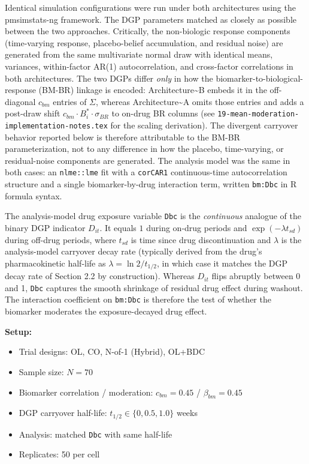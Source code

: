 \documentclass[
]{article}
\begin{document}
Identical simulation configurations were run under both
architectures using the pmsimstats-ng framework. The DGP
parameters matched as closely as possible between the two
approaches. Critically, the non-biologic response components
(time-varying response, placebo-belief accumulation, and
residual noise) are generated from the same multivariate normal
draw with identical means, variances, within-factor AR(1)
autocorrelation, and cross-factor correlations in both
architectures. The two DGPs differ \emph{only} in how the
biomarker-to-biological-response (BM-BR) linkage is encoded:
Architecture\textasciitilde B embeds it in the off-diagonal \(c_{bm}\) entries of
\(\Sigma\), whereas Architecture\textasciitilde A omits those entries and adds a
post-draw shift \(c_{bm} \cdot B_i^{*} \cdot \sigma_{BR}\) to
on-drug BR columns (see
\texttt{19-mean-moderation-implementation-notes.tex} for the
scaling derivation). The divergent carryover behavior reported
below is therefore attributable to the BM-BR parameterization,
not to any difference in how the placebo, time-varying, or
residual-noise components are generated. The analysis model was
the same in both cases: an \texttt{nlme::lme} fit with a
\texttt{corCAR1} continuous-time autocorrelation structure and a
single biomarker-by-drug interaction term, written
\texttt{bm:Dbc} in R formula syntax.

The analysis-model drug exposure variable \texttt{Dbc} is the
\emph{continuous} analogue of the binary DGP indicator \(D_{it}\).
It equals \(1\) during on-drug periods and \(\exp(-\lambda t_{sd})\)
during off-drug periods, where \(t_{sd}\) is time since drug
discontinuation and \(\lambda\) is the analysis-model carryover
decay rate (typically derived from the drug's pharmacokinetic
half-life as \(\lambda = \ln 2 / t_{1/2}\), in which case it
matches the DGP decay rate of Section 2.2 by construction).
Whereas \(D_{it}\) flips abruptly between 0 and 1, \texttt{Dbc}
captures the smooth shrinkage of residual drug effect during
washout. The interaction coefficient on \texttt{bm:Dbc} is
therefore the test of whether the biomarker moderates the
exposure-decayed drug effect.

\textbf{Setup:}

\begin{itemize}
\item Trial designs: OL, CO, N-of-1 (Hybrid), OL+BDC
\item Sample size: $N = 70$
\item Biomarker correlation / moderation: $c_{bm} = 0.45$ /
  $\beta_{bm} = 0.45$
\item DGP carryover half-life: $t_{1/2} \in \{0, 0.5, 1.0\}$ weeks
\item Analysis: matched \texttt{Dbc} with same half-life
\item Replicates: 50 per cell
\end{itemize}
\end{document}
